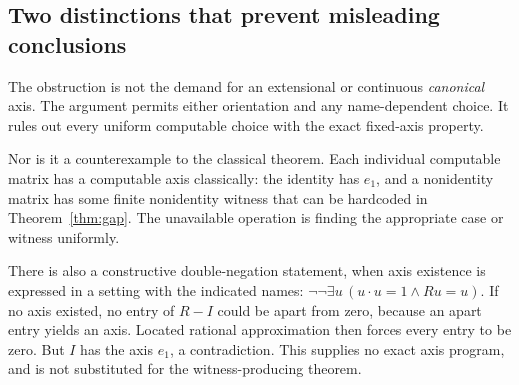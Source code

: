 \documentclass[11pt]{article}
\theoremstyle{definition}\newtheorem{definition}[theorem]{Definition}
\begin{document}
\subsection{Two distinctions that prevent misleading conclusions}
The obstruction is not the demand for an extensional or continuous
\emph{canonical} axis. The argument permits either orientation and any
name-dependent choice. It rules out every uniform computable choice
with the exact fixed-axis property.

Nor is it a counterexample to the classical theorem. Each individual
computable matrix has a computable axis classically: the identity has
$e_1$, and a nonidentity matrix has some finite nonidentity witness
that can be hardcoded in Theorem~\ref{thm:gap}. The unavailable operation
is finding the appropriate case or witness uniformly.

There is also a constructive double-negation statement, when axis
existence is expressed in a setting with the indicated names:
$\neg\neg\exists u\,(u\cdot u=1\wedge Ru=u)$.
If no axis existed, no entry of $R-I$ could be apart from zero, because
an apart entry yields an axis. Located rational approximation then
forces every entry to be zero. But $I$ has the axis $e_1$, a contradiction.
This supplies no exact axis program, and is not substituted for the
witness-producing theorem.


\end{document}
